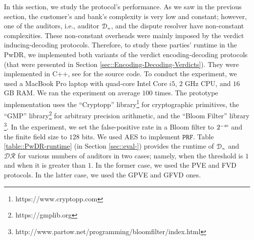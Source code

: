 In this section, we study the protocol's performance.   As we saw in the previous section, the customer's and bank's complexity is very low and constant; however, one of the auditors, i.e., auditor $\mathcal{D}_{\scriptscriptstyle n}$, and the dispute resolver have non-constant complexities.  These non-constant overheads were mainly imposed by the verdict inducing-decoding protocols. Therefore, to study these parties' runtime in the PwDR, we implemented both variants of the verdict encoding-decoding protocols (that were presented in Section  \ref{sec::Encoding-Decoding-Verdicts}). They  were implemented in C++, see  \cite{variant-1,variant-2}  for the source code. To conduct the experiment, we used a MacBook Pro laptop with quad-core Intel Core $i5$, $2$ GHz CPU, and $16$ GB RAM. We ran the experiment on average $100$ times. The prototype implementation uses the ``Cryptopp'' library\footnote{https://www.cryptopp.com}  for cryptographic primitives, the ``GMP'' library\footnote{https://gmplib.org} for arbitrary precision arithmetic, and the ``Bloom Filter'' library \footnote{http://www.partow.net/programming/bloomfilter/index.html}. In the experiment, we set the false-positive rate in a Bloom filter to $2^{\scriptscriptstyle -40}$ and the finite field size to $128$ bits. We used AES to implement $\mathtt{PRF}$. Table \ref{table::PwDR-runtime} (in Section \ref{sec::eval-}) provides the runtime of   $\mathcal{D}_{\scriptscriptstyle n}$ and $\mathcal{DR}$ for various numbers of auditors in two cases; namely, when the threshold is $1$ and when it is greater than $1$. In the former case, we used the PVE and FVD protocols.  In the latter case, we used the GPVE and GFVD ones. 



%


